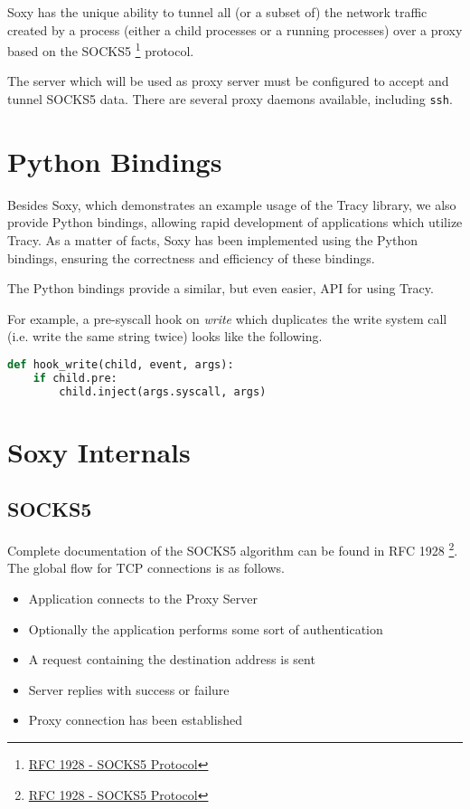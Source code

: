 \documentclass[a4paper, 10pt]{report}
\begin{document}
Soxy has the unique ability to tunnel all (or a subset of) the network traffic
created by a process (either a child processes or a running processes) over a
proxy based on the SOCKS5 \footnote{\href{http://www.ietf.org/rfc/rfc1928.txt}
{RFC 1928 - SOCKS5 Protocol}} protocol.

The server which will be used as proxy server must be configured to accept and
tunnel SOCKS5 data. There are several proxy daemons available, including
\verb=ssh=.

\section{Python Bindings}


Besides Soxy, which demonstrates an example usage of the Tracy library, we
also provide Python bindings, allowing rapid development of applications
which utilize Tracy. As a matter of facts, Soxy has been implemented using the
Python bindings, ensuring the correctness and efficiency of these bindings.

The Python bindings provide a similar, but even easier, API for using Tracy.

For example, a pre-syscall hook on \textit{write} which duplicates the write
system call (i.e. write the same string twice) looks like the following.

\begin{lstlisting}[language=Python]
def hook_write(child, event, args):
    if child.pre:
        child.inject(args.syscall, args)
\end{lstlisting}

\section{Soxy Internals}

\subsection{SOCKS5}
\label{socks5}

Complete documentation of the SOCKS5 algorithm can be found in
RFC 1928 \footnote{\href{http://www.ietf.org/rfc/rfc1928.txt}
{RFC 1928 - SOCKS5 Protocol}}. The global flow for TCP connections
is as follows.

\begin{itemize}
\item Application connects to the Proxy Server
\item Optionally the application performs some sort of authentication
\item A request containing the destination address is sent
\item Server replies with success or failure
\item Proxy connection has been established
\end{itemize}
\end{document}
